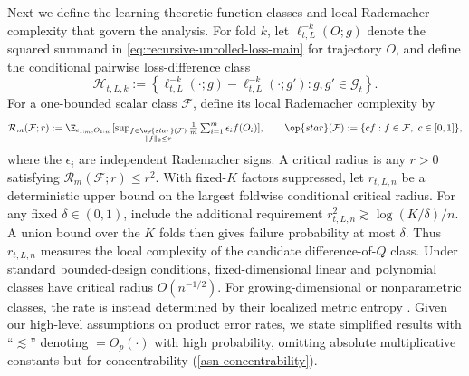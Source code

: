 \documentclass[opre,nonblindrev]{informs4}
\newenvironment{revision}{\begingroup\color{revisionblue}\ignorespaces}{\endgroup}
\providecommand{\cG}{\mathcal G}
\newcommand{\norm}[1]{\lVert#1\rVert}
\providecommand{\mathscr}{\mathcal}
\begin{document}
\begin{revision}
Next we define the learning-theoretic function classes and local Rademacher complexity that govern the analysis. For fold $k$, let $\ell_{t,L}^{-k}(O;g)$ denote the squared summand in
\eqref{eq:recursive-unrolled-loss-main} for trajectory $O$, and define the conditional pairwise
loss-difference class
\[
\mathcal H_{t,L,k}
:=
\left\{
\ell_{t,L}^{-k}(\mathord\cdot;g)
-\ell_{t,L}^{-k}(\mathord\cdot;g'):
g,g'\in\cG_t
\right\}.
\]
For a one-bounded scalar class $\mathcal F$, define its local Rademacher
complexity by
\[ \textstyle 
\mathscr R_m(\mathcal F;r)
:=
\E_{\epsilon_{1:m},O_{1:m}}
[
\sup_{\substack{f\in\op{star}(\mathcal F)\\ \norm{f}_2\le r}}
\frac1m\sum_{i=1}^m\epsilon_i f(O_i)
],
\qquad
\op{star}(\mathcal F):=\{cf:f\in\mathcal F,\ c\in[0,1]\},
\]
where the $\epsilon_i$ are independent Rademacher signs. A critical radius is
any $r>0$ satisfying $\mathscr R_m(\mathcal F;r)\le r^2$. With fixed-$K$ factors
suppressed, let $r_{t,L,n}$ be a deterministic upper bound on the largest
foldwise conditional critical radius. For any fixed $\delta\in(0,1)$, include
the additional requirement $r_{t,L,n}^2\gtrsim\log(K/\delta)/n$.
A union bound over the $K$ folds then gives failure probability at most
$\delta$. Thus $r_{t,L,n}$ measures the local complexity of the
candidate difference-of-$Q$ class. Under standard bounded-design conditions,
fixed-dimensional linear and polynomial classes have critical radius
$O(n^{-1/2})$. For
growing-dimensional or nonparametric classes, the rate is instead determined
by their localized metric entropy \citep[Chaps.~13--14]{wainwright2019high}. Given our high-level assumptions on product error rates, we state simplified results with ``$\lesssim$'' denoting $=O_p(\cdot)$ with high probability, omitting absolute multiplicative constants but for concentrability (\cref{asn-concentrability}). 


\end{revision}
\end{document}
